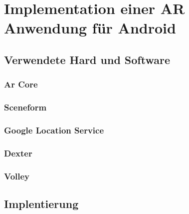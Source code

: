 \chapter{Implementation einer AR Anwendung für Android}

\section{Verwendete Hard und Software}

\subsection{Ar Core}

\subsection{Sceneform}

\subsection{Google Location Service}

\subsection{Dexter}

\subsection{Volley}

\section{Implentierung}



